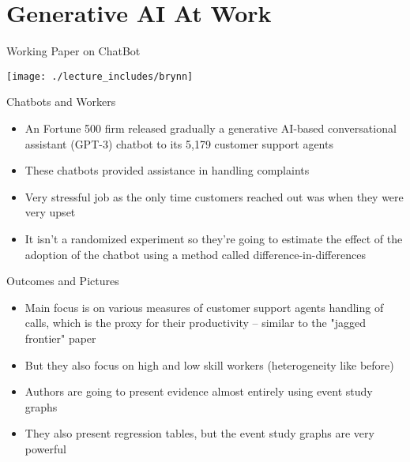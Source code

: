 \documentclass{beamer}
\begin{document}
\section{Generative AI At Work}


\begin{frame}{Working Paper on ChatBot}
\begin{center}
\texttt{[image: ./lecture\_includes/brynn]}
\end{center}
\end{frame}



\begin{frame}{Chatbots and Workers}

\begin{itemize}

\item An Fortune 500 firm released gradually a generative AI-based conversational assistant (GPT-3) chatbot to its  5,179 customer support agents 
\item These chatbots provided assistance in handling complaints
\item Very stressful job as the only time customers reached out was when they were very upset
\item It isn't a randomized experiment so they're going to estimate the effect of the adoption of the chatbot using a method called difference-in-differences

\end{itemize}

\end{frame}

\begin{frame}{Outcomes and Pictures}

\begin{itemize}

\item Main focus is on various measures of customer support agents handling of calls, which is the proxy for their productivity -- similar to the "jagged frontier" paper
\item But they also focus on high and low skill workers (heterogeneity like before)
\item Authors are going to present evidence almost entirely using event study graphs
\item They also present regression tables, but the event study graphs are very powerful

\end{itemize}

\end{frame}
\end{document}
